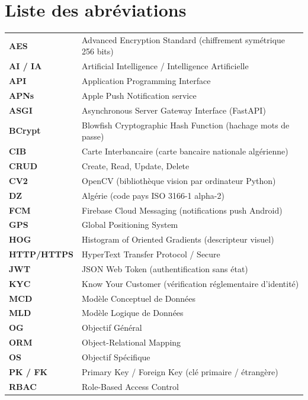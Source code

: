 \chapter*{Liste des abréviations}
\thispagestyle{plain}

\begin{longtable}{p{2.5cm} p{12cm}}
\textbf{AES} & Advanced Encryption Standard (chiffrement symétrique 256 bits) \\
\textbf{AI / IA} & Artificial Intelligence / Intelligence Artificielle \\
\textbf{API} & Application Programming Interface \\
\textbf{APNs} & Apple Push Notification service \\
\textbf{ASGI} & Asynchronous Server Gateway Interface (FastAPI) \\
\textbf{BCrypt} & Blowfish Cryptographic Hash Function (hachage mots de passe) \\
\textbf{CIB} & Carte Interbancaire (carte bancaire nationale algérienne) \\
\textbf{CRUD} & Create, Read, Update, Delete \\
\textbf{CV2} & OpenCV (bibliothèque vision par ordinateur Python) \\
\textbf{DZ} & Algérie (code pays ISO 3166-1 alpha-2) \\
\textbf{FCM} & Firebase Cloud Messaging (notifications push Android) \\
\textbf{GPS} & Global Positioning System \\
\textbf{HOG} & Histogram of Oriented Gradients (descripteur visuel) \\
\textbf{HTTP/HTTPS} & HyperText Transfer Protocol / Secure \\
\textbf{JWT} & JSON Web Token (authentification sans état) \\
\textbf{KYC} & Know Your Customer (vérification réglementaire d'identité) \\
\textbf{MCD} & Modèle Conceptuel de Données \\
\textbf{MLD} & Modèle Logique de Données \\
\textbf{OG} & Objectif Général \\
\textbf{ORM} & Object-Relational Mapping \\
\textbf{OS} & Objectif Spécifique \\
\textbf{PK / FK} & Primary Key / Foreign Key (clé primaire / étrangère) \\
\textbf{RBAC} & Role-Based Access Control \\

\end{longtable}
